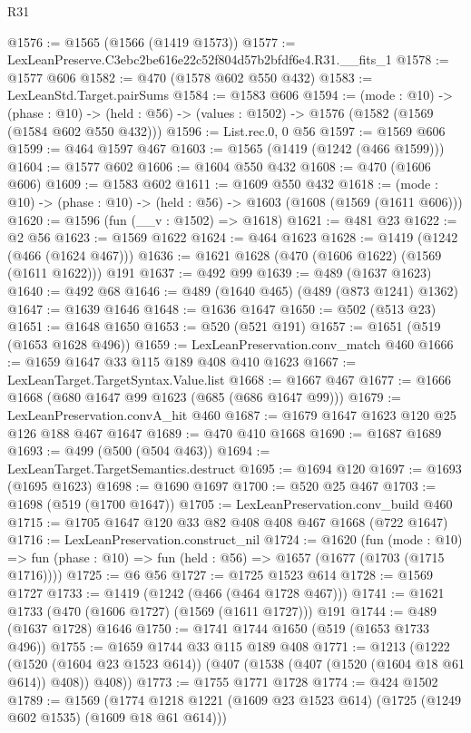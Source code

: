 \begin{lexlean}{R31}
\begin{coremodule}
@1576 := @1565 (@1566 (@1419 @1573))
@1577 := LexLeanPreserve.C3ebc2be616e22c52f804d57b2bfdf6e4.R31.__fits_1
@1578 := @1577 @606
@1582 := @470 (@1578 @602 @550 @432)
@1583 := LexLeanStd.Target.pairSums
@1584 := @1583 @606
@1594 := (mode : @10) ->
  (phase : @10) -> (held : @56) -> (values : @1502) -> @1576 (@1582 (@1569 (@1584 @602 @550 @432)))
@1596 := List.rec.{0, 0} @56
@1597 := @1569 @606
@1599 := @464 @1597 @467
@1603 := @1565 (@1419 (@1242 (@466 @1599)))
@1604 := @1577 @602
@1606 := @1604 @550 @432
@1608 := @470 (@1606 @606)
@1609 := @1583 @602
@1611 := @1609 @550 @432
@1618 := (mode : @10) -> (phase : @10) -> (held : @56) -> @1603 (@1608 (@1569 (@1611 @606)))
@1620 := @1596 (fun (__v : @1502) => @1618)
@1621 := @481 @23
@1622 := @2 @56
@1623 := @1569 @1622
@1624 := @464 @1623
@1628 := @1419 (@1242 (@466 (@1624 @467)))
@1636 := @1621 @1628 (@470 (@1606 @1622) (@1569 (@1611 @1622))) @191
@1637 := @492 @99
@1639 := @489 (@1637 @1623)
@1640 := @492 @68
@1646 := @489 (@1640 @465) (@489 (@873 @1241) @1362)
@1647 := @1639 @1646
@1648 := @1636 @1647
@1650 := @502 (@513 @23)
@1651 := @1648 @1650
@1653 := @520 (@521 @191)
@1657 := @1651 (@519 (@1653 @1628 @496))
@1659 := LexLeanPreservation.conv_match @460
@1666 := @1659 @1647 @33 @115 @189 @408 @410 @1623
@1667 := LexLeanTarget.TargetSyntax.Value.list
@1668 := @1667 @467
@1677 := @1666 @1668 (@680 @1647 @99 @1623 (@685 (@686 @1647 @99)))
@1679 := LexLeanPreservation.convA_hit @460
@1687 := @1679 @1647 @1623 @120 @25 @126 @188 @467 @1647
@1689 := @470 @410 @1668
@1690 := @1687 @1689
@1693 := @499 (@500 (@504 @463))
@1694 := LexLeanTarget.TargetSemantics.destruct
@1695 := @1694 @120
@1697 := @1693 (@1695 @1623)
@1698 := @1690 @1697
@1700 := @520 @25 @467
@1703 := @1698 (@519 (@1700 @1647))
@1705 := LexLeanPreservation.conv_build @460
@1715 := @1705 @1647 @120 @33 @82 @408 @408 @467 @1668 (@722 @1647)
@1716 := LexLeanPreservation.construct_nil
@1724 := @1620
    (fun (mode : @10) =>
    fun (phase : @10) => fun (held : @56) => @1657 (@1677 (@1703 (@1715 @1716))))
@1725 := @6 @56
@1727 := @1725 @1523 @614
@1728 := @1569 @1727
@1733 := @1419 (@1242 (@466 (@464 @1728 @467)))
@1741 := @1621 @1733 (@470 (@1606 @1727) (@1569 (@1611 @1727))) @191
@1744 := @489 (@1637 @1728) @1646
@1750 := @1741 @1744 @1650 (@519 (@1653 @1733 @496))
@1755 := @1659 @1744 @33 @115 @189 @408
@1771 := @1213
    (@1222
      (@1520 (@1604 @23 @1523 @614))
      (@407 (@1538 (@407 (@1520 (@1604 @18 @61 @614)) @408)) @408))
@1773 := @1755 @1771 @1728
@1774 := @424 @1502
@1789 := @1569
    (@1774 @1218 @1221 (@1609 @23 @1523 @614) (@1725 (@1249 @602 @1535) (@1609 @18 @61 @614)))

\end{coremodule}
\end{lexlean}
